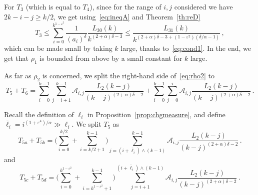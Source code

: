 \documentclass[AHL,Unicode,longabstracts]{cedram}
\newcommand{\ga}{\alpha}
\newcommand{\gd}{\delta}
\newcommand{\gep}{\varepsilon}
\newcommand{\cA}{\ensuremath{\mathcal{A}}}
\begin{document}
For $T_3$ (which is equal to $T_4$), since for the range of $i,j$ considered we have $2k-i-j \geq k/2$, we get using~\eqref{eq:ineqA} and Theorem~\ref{th:reD}
\begin{equation}
T_3 \le \sum_{i=0}^{k^{1-\gep^2}} \frac{1}{(a_i)^{\gd}}\frac{L_{30}(k)}{k^{(2+\ga) \delta - 3}} \leq \frac{L_{31}(k)}{ k^{(2+\ga) \delta - 3 +(1-\gep^2)(\gd/\ga-1)}}\,,
\end{equation}
which can be made small by taking $k$ large, thanks to~\eqref{eq:cond1}. In the end, we get that $\rho_1$ is bounded from above by a small constant for $k$ large.



As far as $\rho_2$ is concerned, we split the right-hand side of~\eqref{eq:rho2} to
\begin{equation}
T_5 + T_6 = \sum_{i=0}^{k-1} \sum_{j=i+1}^{k-1} \cA_{i,j} \frac{L_2(k-j)}{(k-j)^{(2+\ga)\delta -2}} + \sum_{i=0}^{k-1} \sum_{j=0}^{i} \cA_{i,j} \frac{L_2(k-j)}{(k-j)^{(2+\ga)\delta -2}}\,.
\end{equation}

Recall the definition of $\ell_i$ in Proposition~\ref{prop:chgmeasure}, and define $\bar \ell_i=i^{(1+\gep^4)/\ga} \gg \ell_i$. We split $T_5$ as
\begin{equation}
T_{5a} + T_{5b} = \bigg(\sum_{i=0}^{ k/2} + \sum_{i= k/2 + 1}^{k-1} \bigg) \sum_{j=(i + \bar \ell_i) \wedge (k-1)}^{k-1} \cA_{i,j} \frac{L_2(k-j)}{(k-j)^{(2+\ga)\delta -2}}\,.
\end{equation}
and
\begin{equation}
T_{5c} + T_{5d} = \bigg(\sum_{i=0}^{ k^{1- \gep^ 2} } + \sum_{i= k^{1- \gep^ 2} +1}^{k-1} \bigg) \sum_{j=i + 1}^{(i + \bar \ell_i) \wedge (k-1)} \cA_{i,j} \frac{L_2(k-j)}{(k-j)^{(2+\ga)\delta -2}}\,.
\end{equation}
\end{document}
